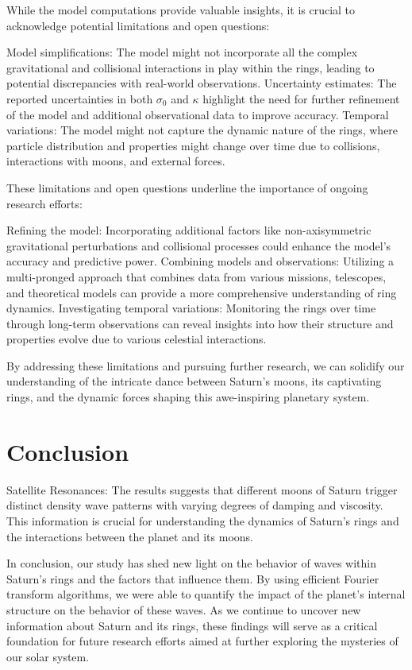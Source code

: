 \documentclass{article}
\begin{document}
While the model computations provide valuable insights, it is crucial to acknowledge potential limitations and open questions:

Model simplifications: The model might not incorporate all the complex gravitational and collisional interactions in play within the rings, leading to potential discrepancies with real-world observations.
Uncertainty estimates: The reported uncertainties in both $\sigma_{0}$ and $\kappa$ highlight the need for further refinement of the model and additional observational data to improve accuracy.
Temporal variations: The model might not capture the dynamic nature of the rings, where particle distribution and properties might change over time due to collisions, interactions with moons, and external forces.

These limitations and open questions underline the importance of ongoing research efforts:

Refining the model: Incorporating additional factors like non-axisymmetric gravitational perturbations and collisional processes could enhance the model's accuracy and predictive power.
Combining models and observations: Utilizing a multi-pronged approach that combines data from various missions, telescopes, and theoretical models can provide a more comprehensive understanding of ring dynamics.
Investigating temporal variations: Monitoring the rings over time through long-term observations can reveal insights into how their structure and properties evolve due to various celestial interactions.

By addressing these limitations and pursuing further research, we can solidify our understanding of the intricate dance between Saturn's moons, its captivating rings, and the dynamic forces shaping this awe-inspiring planetary system.







\section{Conclusion}

Satellite Resonances: The results suggests that different moons of Saturn trigger distinct density wave patterns with varying degrees of damping and viscosity. This information is crucial for understanding the dynamics of Saturn's rings and the interactions between the planet and its moons.

In conclusion, our study has shed new light on the behavior of waves within Saturn's rings and the factors that influence them. By using efficient Fourier transform algorithms, we were able to quantify the impact of the planet's internal structure on the behavior of these waves. As we continue to uncover new information about Saturn and its rings, these findings will serve as a critical foundation for future research efforts aimed at further exploring the mysteries of our solar system.
\end{document}
